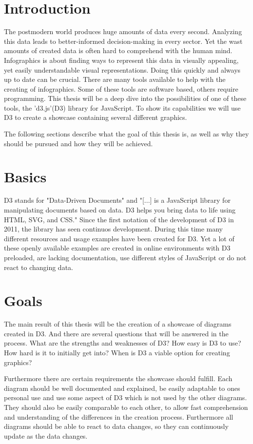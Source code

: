 \documentclass[
a4paper,     %
12pt         %
]{scrartcl}  %
\begin{document}
\section{Introduction}
The postmodern world produces huge amounts of data every second. Analyzing this data leads to better-informed decision-making in every sector. Yet the wast amounts of created data is often hard to comprehend with the human mind. Infographics is about finding ways to represent this data in visually appealing, yet easily understandable visual representations. Doing this quickly and always up to date can be crucial. There are many tools available to help with the creating of infographics. Some of these tools are software based, others require programming. This thesis will be a deep dive into the possibilities of one of these tools, the 'd3.js'(D3) library for JavaScript. To show its capabilities we will use D3 to create a showcase containing several different graphics.

The following sections describe what the goal of this thesis is, as well as why they should be pursued and how they will be achieved.

\section{Basics}
D3 stands for "Data-Driven Documents" and "[...] is a JavaScript library for manipulating documents based on data. D3 helps you bring data to life using HTML, SVG, and CSS." \cite{d3js}
Since the first notation of the development of D3 in 2011, the library has seen continuos development. During this time many different resources and usage examples have been created for D3. Yet a lot of these openly available examples are created in online environments with D3 preloaded, are lacking documentation, use different styles of JavaScript or do not react to changing data.

\section{Goals}
The main result of this thesis will be the creation of a showcase of diagrams created in D3. And there are several questions that will be answered in the process. What are the strengths and weaknesses of D3? How easy is D3 to use? How hard is it to initially get into? When is D3 a viable option for creating graphics? 

Furthermore there are certain requirements the showcase should fulfill. Each diagram should be well documented and explained, be easily adaptable to ones personal use and use some aspect of D3 which is not used by the other diagrams. They should also be easily comparable to each other, to allow fast comprehension and understanding of the differences in the creation process. Furthermore all diagrams should be able to react to data changes, so they can continuously update as the data changes.
\end{document}
